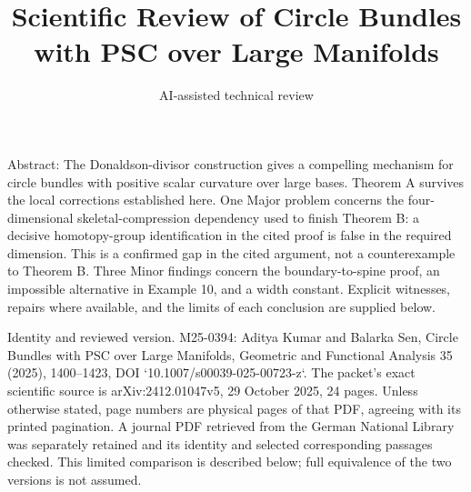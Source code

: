 \documentclass[10pt]{article}
\title{Scientific Review of
Circle Bundles with PSC
over Large Manifolds}
\author{AI-assisted technical review}
\date{}
\begin{document}
\maketitle
Abstract: The Donaldson-divisor construction gives a compelling mechanism for circle bundles with positive scalar curvature over large bases. Theorem A survives the local corrections established here. One Major problem concerns the four-dimensional skeletal-compression dependency used to finish Theorem B: a decisive homotopy-group identification in the cited proof is false in the required dimension. This is a confirmed gap in the cited argument, not a counterexample to Theorem B. Three Minor findings concern the boundary-to-spine proof, an impossible alternative in Example 10, and a width constant. Explicit witnesses, repairs where available, and the limits of each conclusion are supplied below.\par
Identity and reviewed version. M25-0394: Aditya Kumar and Balarka Sen, Circle Bundles with PSC over Large Manifolds, Geometric and Functional Analysis 35 (2025), 1400–1423, DOI `10.1007/s00039-025-00723-z`. The packet’s exact scientific source is arXiv:2412.01047v5, 29 October 2025, 24 pages. Unless otherwise stated, page numbers are physical pages of that PDF, agreeing with its printed pagination. A journal PDF retrieved from the German National Library was separately retained and its identity and selected corresponding passages checked. This limited comparison is described below; full equivalence of the two versions is not assumed.\par
\end{document}
